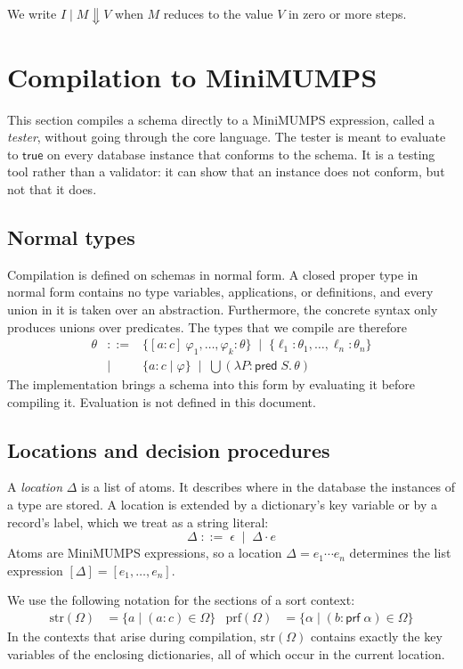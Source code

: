 \documentclass[11pt]{article}
\newcommand{\kw}[1]{\mathsf{#1}}
\newcommand{\prf}[1]{\kw{prf}\;#1}
\newcommand{\pred}[1]{\kw{pred}\;#1}
\newcommand{\true}{\kw{true}}
\newcommand{\gdict}[4]{\{[#1 : #2]\ #3 : #4\}}
\newcommand{\refine}[3]{\{#1 : #2 \mid #3\}}
\newcommand{\iabs}[3]{\lambda #1 : #2.\,#3}
\newcommand{\union}[1]{\textstyle\bigcup #1}
\theoremstyle{remark}
\begin{document}
We write $I \mid M \Downarrow V$ when $M$ reduces to the value $V$ in zero or more steps.

\FloatBarrier
\section{Compilation to MiniMUMPS}
\label{sec:compilation}

This section compiles a schema directly to a MiniMUMPS expression, called a \emph{tester}, without
going through the core language. The tester is meant to evaluate to $\true$ on every database
instance that conforms to the schema. It is a testing tool rather than a validator: it can show
that an instance does not conform, but not that it does.

\subsection{Normal types}

Compilation is defined on schemas in normal form. A closed proper type in normal form contains no
type variables, applications, or definitions, and every union in it is taken over an abstraction.
Furthermore, the concrete syntax only produces unions over predicates. The types that we compile
are therefore
\[
\begin{array}{lcl}
\theta & ::= & \gdict{a}{c}{\varphi_1, \ldots, \varphi_k}{\theta}
   \;\mid\; \{\ell_1 : \theta_1, \ldots, \ell_n : \theta_n\} \\
 & \mid & \refine{a}{c}{\varphi}
   \;\mid\; \union{(\iabs{P}{\pred{S}}{\theta})}
\end{array}
\]
The implementation brings a schema into this form by evaluating it before compiling it. Evaluation
is not defined in this document.

\subsection{Locations and decision procedures}

A \emph{location} $\Delta$ is a list of atoms. It describes where in the database the instances of
a type are stored. A location is extended by a dictionary's key variable or by a record's label,
which we treat as a string literal:
\[ \Delta \;::=\; \epsilon \;\mid\; \Delta \cdot e \]
Atoms are MiniMUMPS expressions, so a location $\Delta = e_1 \cdots e_n$ determines the list
expression $[\Delta] = [e_1, \ldots, e_n]$.

We use the following notation for the sections of a sort context:
\begin{align*}
\mathrm{str}(\Omega) &= \{ a \mid (a : c) \in \Omega \} &
\mathrm{prf}(\Omega) &= \{ \alpha \mid (b : \prf{\alpha}) \in \Omega \}
\end{align*}
In the contexts that arise during compilation, $\mathrm{str}(\Omega)$ contains exactly the key
variables of the enclosing dictionaries, all of which occur in the current location.
\end{document}
